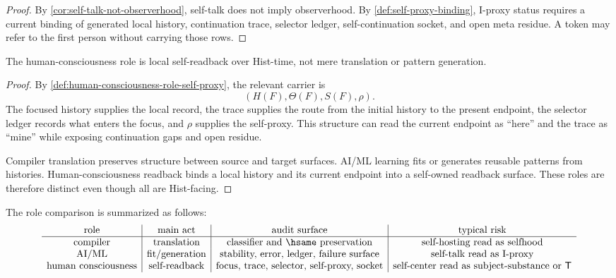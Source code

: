 \begin{proof}
By \autoref{cor:self-talk-not-observerhood}, self-talk does not imply
observerhood. By \autoref{def:self-proxy-binding}, I-proxy status
requires a current binding of generated local history, continuation
trace, selector ledger, self-continuation socket, and open meta residue.
A token may refer to the first person without carrying those rows.
\end{proof}

\begin{theorem}
\label{thm:human-consciousness-local-self-readback}
The human-consciousness role is local self-readback over Hist-time, not
mere translation or pattern generation.
\end{theorem}

\begin{proof}
By \autoref{def:human-consciousness-role-self-proxy}, the relevant carrier
is
$$
(H(F),\Theta(F),S(F),\rho).
$$
The focused history supplies the local record, the trace supplies the
route from the initial history to the present endpoint, the selector
ledger records what enters the focus, and $\rho$ supplies the self-proxy.
This structure can read the current endpoint as ``here'' and the trace as
``mine'' while exposing continuation gaps and open residue.

Compiler translation preserves structure between source and target
surfaces. AI/ML learning fits or generates reusable patterns from
histories. Human-consciousness readback binds a local history and its
current endpoint into a self-owned readback surface. These roles are
therefore distinct even though all are Hist-facing.
\end{proof}

\begin{definition}
\label{def:compiler-ai-consciousness-comparison-matrix}
The role comparison is summarized as follows:
$$
\begin{array}{c|c|c|c}
\text{role} & \text{main act} & \text{audit surface} & \text{typical risk}\\
\hline
\text{compiler} &
\text{translation} &
\text{classifier and }\hsame\text{ preservation} &
\text{self-hosting read as selfhood}\\
\text{AI/ML} &
\text{fit/generation} &
\text{stability, error, ledger, failure surface} &
\text{self-talk read as I-proxy}\\
\text{human consciousness} &
\text{self-readback} &
\text{focus, trace, selector, self-proxy, socket} &
\text{self-center read as subject-substance or }\mathsf{T}
\end{array}
$$
\end{definition}

